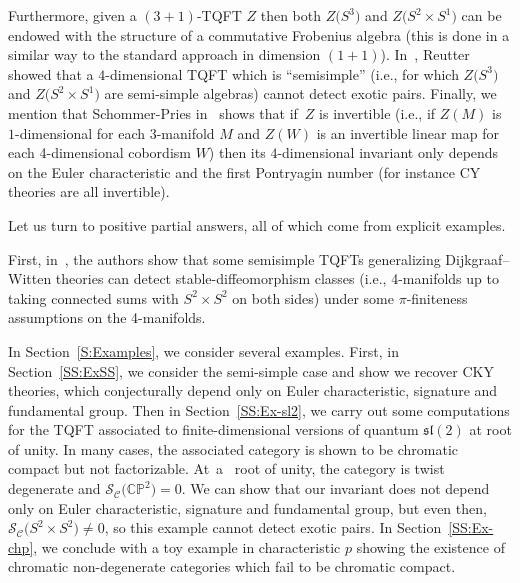 \documentclass[pdftex]{sigma}
\numberwithin{equation}{section}
\numberwithin{theorem}{section}
\numberwithin{proposition}{section}
\numberwithin{definition}{section}
\numberwithin{lemma}{section}
\numberwithin{corollary}{section}
\numberwithin{remark}{section}
\numberwithin{example}{section}
\newcommand{\cat}{\mathcal{C}}
\newcommand{\slt}{\ensuremath{\mathfrak{sl}(2)}}
\newcommand{\CP}{\mathbb{CP}}
\newcommand{\TSkein}{{\mathscr{S}}}
\newcounter{exo} \newcounter{numexercice}
\begin{document}
Furthermore, given a $(3+1)$-TQFT $Z$ then both $Z\bigl(S^3\bigr)$ and $Z\bigl(S^2\times S^1\bigr)$ can be endowed with the structure of a commutative Frobenius algebra (this is done in a similar way to the standard approach in dimension $(1+1)$).
In~\cite{Reutter}, Reutter showed that a $4$-dimensional TQFT which is ``semisimple'' (i.e., for which $Z\bigl(S^3\bigr)$ and $Z\bigl(S^2\times S^1\bigr)$ are semi-simple algebras) cannot detect exotic pairs.
Finally, we mention that Schommer-Pries in~\cite[Theorem~7.6]{SP} shows that if~$Z$ is invertible (i.e.,
if
 $Z(M)$ is $1$-dimensional for each $3$-manifold $M$ and $Z(W)$ is an invertible linear map for each 4-dimensional cobordism $W$) then its $4$-dimensional invariant only depends on the Euler characteristic and the first Pontryagin number (for instance CY theories are all invertible).

Let us turn to positive partial answers, all of which come from explicit examples.

First, in~\cite{ReutterSP}, the authors show that some semisimple TQFTs generalizing Dijkgraaf--Witten theories can detect stable-diffeomorphism classes \big(i.e., 4-manifolds up to taking connected sums with $S^2\times S^2$ on both sides\big) under some $\pi$-finiteness assumptions on the 4-manifolds.

In Section~\ref{S:Examples}, we consider several examples. First, in Section~\ref{SS:ExSS}, we consider the semi-simple case and show we recover CKY theories, which conjecturally depend only on Euler characteristic, signature and fundamental group.
Then in Section~\ref{SS:Ex-sl2}, we
carry out some computations
for the TQFT associated to finite-dimensional versions of quantum $\slt$ at root of unity. In many
cases, the associated category is shown to be chromatic compact but not
factorizable. At~a~ root of unity, the category is twist
degenerate and $\TSkein_\cat\bigl(\CP^2\bigr)=0$. We can show that our invariant does not depend only on Euler characteristic, signature and fundamental group, but even then, ${\TSkein_\cat\bigl(S^2\times S^2\bigr)\neq 0}$, so this example cannot detect
exotic pairs.
In Section~\ref{SS:Ex-chp}, we conclude with a toy example
in characteristic $p$ showing the existence of chromatic
non-degenerate categories which fail to be chromatic compact.
\end{document}
